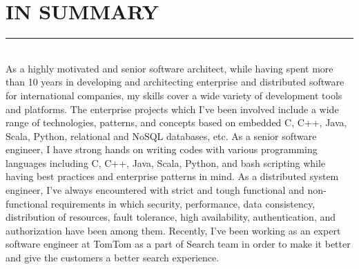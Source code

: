 \documentclass[10pt,a4paper]{article}
\begin{document}
\thispagestyle{fancy}

\hfill \break
\section{IN SUMMARY}
\noindent \rule {3.4cm}{0.4pt} \\
As a highly motivated and senior software architect, while having spent more than 10 years in developing and architecting enterprise and distributed software for international companies, my skills cover a wide variety of development tools and platforms. The enterprise projects which I've been involved include a wide range of technologies, patterns, and concepts based on embedded C, C++, Java, Scala, Python, relational and NoSQL databases, etc. As a senior software engineer, I have strong hands on writing codes with various programming languages including C, C++, Java, Scala, Python, and bash scripting while having best practices and enterprise patterns in mind. As a distributed system engineer, I've always encountered with strict and tough functional and non-functional requirements in which security, performance, data consistency, distribution of resources, fault tolerance, high availability, authentication, and authorization have been among them. Recently, I've been working as an expert software engineer at TomTom as a part of Search team in order to make it better and give the customers a better search experience.
\end{document}
